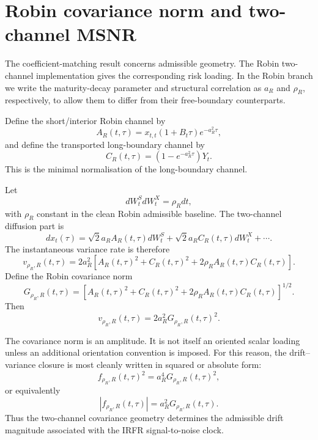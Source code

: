 \documentclass[11pt]{article}
\numberwithin{equation}{section}
\begin{document}
\section{Robin covariance norm and two-channel MSNR}

The coefficient-matching result concerns admissible geometry. The Robin two-channel implementation gives the corresponding risk loading. In the Robin branch we write the maturity-decay parameter and structural correlation as \(a_R\) and \(\rho_R\), respectively, to allow them to differ from their free-boundary counterparts.

Define the short/interior Robin channel by
\begin{equation}
\label{eq:AR-definition}
A_R(t,\tau)=
x_{t,t}(1+B_t\tau)e^{-a_R^2\tau},
\end{equation}
and define the transported long-boundary channel by
\begin{equation}
\label{eq:CR-definition}
C_R(t,\tau)=
\left(1-e^{-a_R^2\tau}\right)Y_t.
\end{equation}
This is the minimal normalisation of the long-boundary channel.

Let
\begin{equation}
\label{eq:rhoR-correlation}
dW_t^SdW_t^X=\rho_Rdt,
\end{equation}
with \(\rho_R\) constant in the clean Robin admissible baseline. The two-channel diffusion part is
\begin{equation}
\label{eq:two-channel-diffusion}
dx_t(\tau)
=
\sqrt{2}a_RA_R(t,\tau)dW_t^S
+
\sqrt{2}a_RC_R(t,\tau)dW_t^X
+
\cdots.
\end{equation}
The instantaneous variance rate is therefore
\begin{equation}
\label{eq:robin-variance-rate}
v_{\rho_R,R}(t,\tau)=
2a_R^2
\left[
A_R(t,\tau)^2
+
C_R(t,\tau)^2
+
2\rho_RA_R(t,\tau)C_R(t,\tau)
\right].
\end{equation}
Define the Robin covariance norm
\begin{equation}
\label{eq:GrhoRR}
G_{\rho_R,R}(t,\tau)=
\left[
A_R(t,\tau)^2
+
C_R(t,\tau)^2
+
2\rho_RA_R(t,\tau)C_R(t,\tau)
\right]^{1/2}.
\end{equation}
Then
\[
v_{\rho_R,R}(t,\tau)=2a_R^2G_{\rho_R,R}(t,\tau)^2.
\]

The covariance norm is an amplitude. It is not itself an oriented scalar loading unless an additional orientation convention is imposed. For this reason, the drift--variance closure is most cleanly written in squared or absolute form:
\begin{equation}
\label{eq:robin-drift-magnitude}
f_{\rho_R,R}(t,\tau)^2=
a_R^4G_{\rho_R,R}(t,\tau)^2,
\end{equation}
or equivalently
\begin{equation}
\label{eq:robin-drift-absolute}
|f_{\rho_R,R}(t,\tau)|=
a_R^2G_{\rho_R,R}(t,\tau).
\end{equation}
Thus the two-channel covariance geometry determines the admissible drift magnitude associated with the IRFR signal-to-noise clock.
\end{document}
